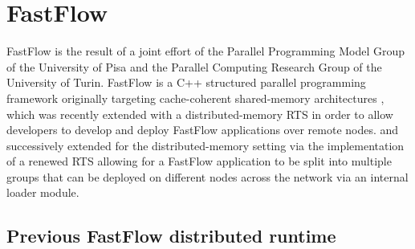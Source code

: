 \section{FastFlow}
FastFlow is the result of a joint effort of the Parallel Programming Model Group of the University of Pisa and the Parallel Computing Research Group of the University of Turin. FastFlow is a C++ structured parallel programming framework originally targeting cache-coherent shared-memory architectures \cite{fastflow}, which was recently extended with a distributed-memory RTS in order to allow developers to develop and deploy FastFlow applications over remote nodes.  and successively extended for the distributed-memory setting via the implementation of a renewed RTS allowing for a FastFlow application to be split into multiple groups that can be deployed on different nodes across the network via an internal loader module. 
\subsection{Previous FastFlow distributed runtime}
